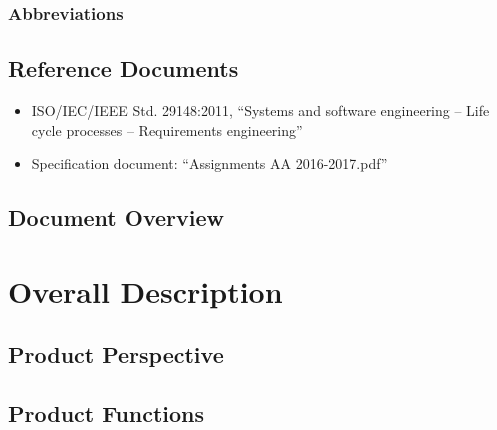 \documentclass[english]{article}
\begin{document}
\subsubsection{Abbreviations}

\subsection{Reference Documents}

\begin{itemize}
	\item{ISO/IEC/IEEE Std. 29148:2011, “Systems and software engineering -- Life cycle processes -- Requirements engineering”}
	\item{Specification document: “Assignments AA 2016-2017.pdf”}
\end{itemize}

\subsection{Document Overview}

\newpage{}

\section{Overall Description}

\subsection{Product Perspective}

\subsection{Product Functions}
\end{document}
